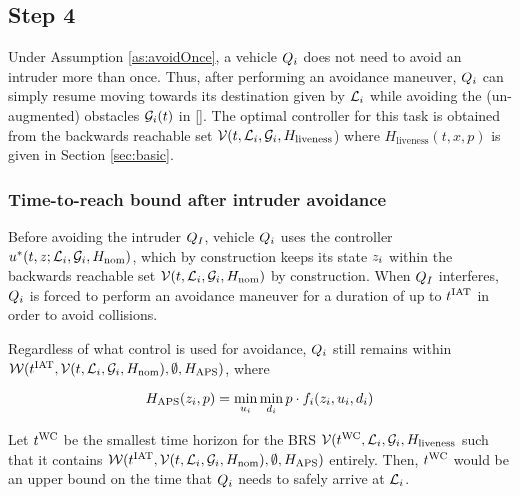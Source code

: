 \subsection{Step 4}
Under Assumption \ref{as:avoidOnce}, a vehicle $Q_{i}$ does not need to avoid an intruder more than once. Thus, after performing an avoidance maneuver, $Q_{i}$ can simply resume moving towards its destination given by $\mathcal{L}_i$ while avoiding the (un-augmented) obstacles $\mathcal{G}_i(t)$ in \eqref{}. The optimal controller for this task is obtained from the backwards reachable set $\mathcal{V}(t, \mathcal{L}_i, \mathcal{G}_i, H_\text{liveness}$) where $H_\text{liveness}(t, x, p)$ is given in Section \ref{sec:basic}.

\subsubsection{Time-to-reach bound after intruder avoidance}
Before avoiding the intruder $Q_{I}$, vehicle $Q_{i}$ uses the controller $u^*(t, z; \mathcal{L}_i, \mathcal{G}_i, H_\text{nom})$, which by construction keeps its state $z_i$ within the backwards reachable set $\mathcal{V}(t, \mathcal{L}_i, \mathcal{G}_i, H_\text{nom})$ by construction. When $Q_{I}$ interferes, $Q_{i}$ is forced to perform an avoidance maneuver for a duration of up to $t^\text{IAT}$ in order to avoid collisions. 

Regardless of what control is used for avoidance, $Q_{i}$ still remains within $\mathcal{W}(t^\text{IAT}, \mathcal{V}(t, \mathcal{L}_i, \mathcal{G}_i, H_\text{nom}), \emptyset, H_\text{APS})$, where

\begin{equation}
H_\text{APS}(z_i, p) = \min_{u_i} \min_{d_i} p \cdot f_i (z_i, u_i, d_i)
\end{equation}

Let $t^\text{WC}$ be the smallest time horizon for the BRS $\mathcal{V}(t^\text{WC}, \mathcal{L}_i, \mathcal{G}_i, H_\text{liveness}$ such that it contains $\mathcal{W}(t^\text{IAT}, \mathcal{V}(t, \mathcal{L}_i, \mathcal{G}_i, H_\text{nom}), \emptyset, H_\text{APS})$ entirely. Then, $t^\text{WC}$ would be an upper bound on the time that $Q_{i}$ needs to safely arrive at $\mathcal{L}_i$.